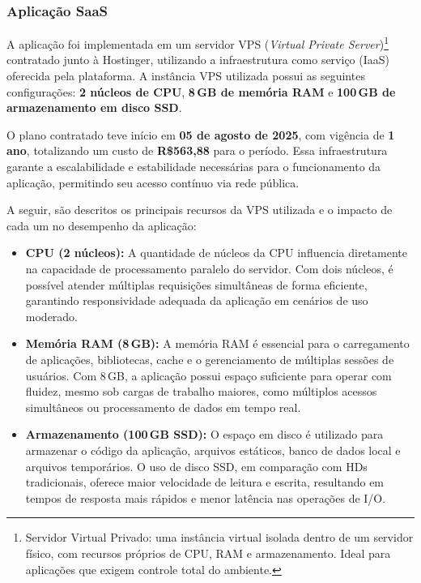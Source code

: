 \subsubsection{Aplicação SaaS}
\par A aplicação foi implementada em um servidor VPS (\textit{Virtual Private Server})\footnote{Servidor Virtual Privado: uma instância virtual isolada dentro de um servidor físico, com recursos próprios de CPU, RAM e armazenamento. Ideal para aplicações que exigem controle total do ambiente.} contratado junto à Hostinger, utilizando a infraestrutura como serviço (IaaS) oferecida pela plataforma. A instância VPS utilizada possui as seguintes configurações: \textbf{2 núcleos de CPU}, \textbf{8\,GB de memória RAM} e \textbf{100\,GB de armazenamento em disco SSD}.
\par O plano contratado teve início em \textbf{05 de agosto de 2025}, com vigência de \textbf{1 ano}, totalizando um custo de \textbf{R\$563,88} para o período. Essa infraestrutura garante a escalabilidade e estabilidade necessárias para o funcionamento da aplicação, permitindo seu acesso contínuo via rede pública.
\par A seguir, são descritos os principais recursos da VPS utilizada e o impacto de cada um no desempenho da aplicação:

\begin{itemize}
    \item \textbf{CPU (2 núcleos):} A quantidade de núcleos da CPU influencia diretamente na capacidade de processamento paralelo do servidor. Com dois núcleos, é possível atender múltiplas requisições simultâneas de forma eficiente, garantindo responsividade adequada da aplicação em cenários de uso moderado.

    \item \textbf{Memória RAM (8\,GB):} A memória RAM é essencial para o carregamento de aplicações, bibliotecas, cache e o gerenciamento de múltiplas sessões de usuários. Com 8\,GB, a aplicação possui espaço suficiente para operar com fluidez, mesmo sob cargas de trabalho maiores, como múltiplos acessos simultâneos ou processamento de dados em tempo real.

    \item \textbf{Armazenamento (100\,GB SSD):} O espaço em disco é utilizado para armazenar o código da aplicação, arquivos estáticos, banco de dados local e arquivos temporários. O uso de disco SSD, em comparação com HDs tradicionais, oferece maior velocidade de leitura e escrita, resultando em tempos de resposta mais rápidos e menor latência nas operações de I/O.
\end{itemize}


